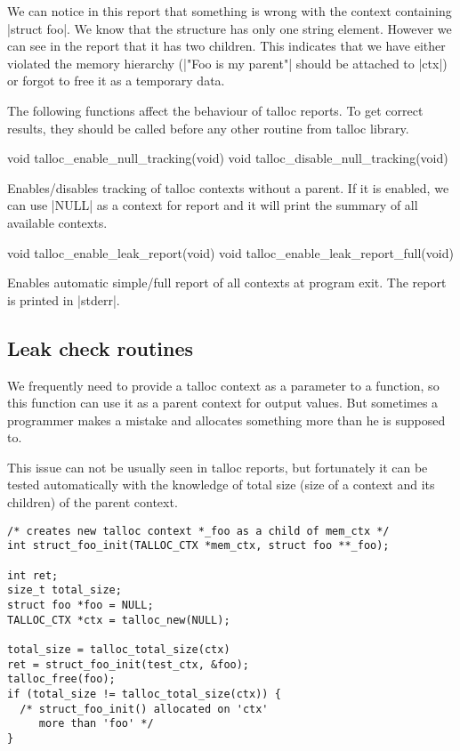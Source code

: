 \noindent
We can notice in this report that something is wrong with the context containing
|struct foo|. We know that the structure has only one string element. However we
can see in the report that it has two children. This indicates that we have
either violated the memory hierarchy (|"Foo is my parent"| should be attached to
|ctx|) or forgot to free it as a temporary data.

The following functions affect the behaviour of talloc reports. To get correct
results, they should be called before any other routine from talloc library.

\begin{funcproto}
void talloc_enable_null_tracking(void)
void talloc_disable_null_tracking(void)
\end{funcproto}
\begin{funcdesc}
Enables/disables tracking of talloc contexts without a parent. If it is enabled,
we can use |NULL| as a context for report and it will print the summary of all
available contexts.
\end{funcdesc}

\begin{funcproto}
void talloc_enable_leak_report(void)
void talloc_enable_leak_report_full(void)
\end{funcproto}
\begin{funcdesc}
  Enables automatic simple/full report of all contexts at program exit. The
  report is printed in |stderr|.
\end{funcdesc}

\subsection{Leak check routines}

We frequently need to provide a talloc context as a parameter to a function, so
this function can use it as a parent context for output values. But sometimes a
programmer makes a mistake and allocates something more than he is supposed to.

This issue can not be usually seen in talloc reports, but fortunately it can be
tested automatically with the knowledge of total size (size of a context and
its children) of the parent context.

\begin{lstlisting}[caption={Leak check example},
morekeywords={talloc_total_size,talloc_free}]
/* creates new talloc context *_foo as a child of mem_ctx */
int struct_foo_init(TALLOC_CTX *mem_ctx, struct foo **_foo);

int ret;
size_t total_size;
struct foo *foo = NULL;
TALLOC_CTX *ctx = talloc_new(NULL);

total_size = talloc_total_size(ctx)
ret = struct_foo_init(test_ctx, &foo);
talloc_free(foo);
if (total_size != talloc_total_size(ctx)) {
  /* struct_foo_init() allocated on 'ctx'
     more than 'foo' */
}
\end{lstlisting}

